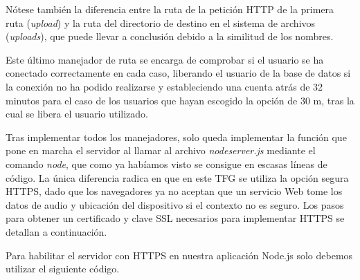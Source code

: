 Nótese también la diferencia entre la ruta de la petición HTTP de la primera ruta (\emph{upload}) y la ruta del directorio de destino en el sistema de archivos (\emph{uploads}), que puede llevar a conclusión debido a la similitud de los nombres.

Este último manejador de ruta se encarga de comprobar si el usuario se ha conectado correctamente en cada caso, liberando el usuario de la base de datos si la conexión no ha podido realizarse y estableciendo una cuenta atrás de 32 minutos para el caso de los usuarios que hayan escogido la opción de 30 m, tras la cual se libera el usuario utilizado.


Tras implementar todos los manejadores, solo queda implementar la función que pone en marcha el servidor al llamar al archivo \emph{nodeserver.js} mediante el comando \emph{node}, que como ya habíamos visto se consigue en escasas líneas de código. La única diferencia radica en que en este TFG se utiliza la opción segura HTTPS, dado que los navegadores ya no aceptan que un servicio Web tome los datos de audio y ubicación del dispositivo si el contexto no es seguro. Los pasos para obtener un certificado y clave \acrshort{SSL} necesarios para implementar HTTPS se detallan a continuación.

Para habilitar el servidor con HTTPS en nuestra aplicación Node.js solo debemos utilizar el siguiente código.


